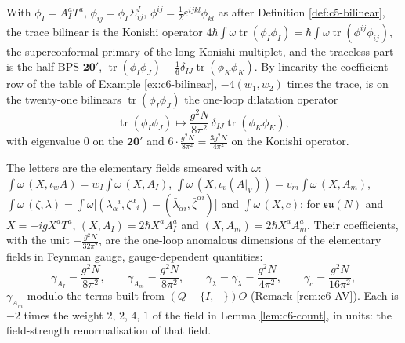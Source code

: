 \begin{remark}
With $\phi_I=A^a_IT^a$, $\phi_{ij}=\phi_I\Sigma^I_{ij}$, $\phi^{ij}=\tfrac12\varepsilon^{ijkl}\phi_{kl}$ as after Definition \ref{def:c5-bilinear}, the trace bilinear is the Konishi operator $4\hbar\int\omega\operatorname{tr}(\phi_I\phi_I)=\hbar\int\omega\operatorname{tr}(\phi^{ij}\phi_{ij})$, the superconformal primary of the long Konishi multiplet, and the traceless part is the half-BPS $\mathbf{20'}$, $\operatorname{tr}(\phi_I\phi_J)-\tfrac16\delta_{IJ}\operatorname{tr}(\phi_K\phi_K)$. By linearity the coefficient row of the table of Example \ref{ex:c6-bilinear}, $-4(w_1,w_2)$ times the trace, is on the twenty-one bilinears $\operatorname{tr}(\phi_I\phi_J)$ the one-loop dilatation operator
\[
\operatorname{tr}(\phi_I\phi_J)\longmapsto\frac{g^2N}{8\pi^2}\,\delta_{IJ}\operatorname{tr}(\phi_K\phi_K),
\]
with eigenvalue $0$ on the $\mathbf{20'}$ and $6\cdot\frac{g^2N}{8\pi^2}=\frac{3g^2N}{4\pi^2}$ on the Konishi operator.
\end{remark}

\begin{remark}
The letters are the elementary fields smeared with $\omega$: $\int\omega\,(X,\iota_wA)=w_I\int\omega\,(X,A_I)$, $\int\omega\,(X,\iota_v(A|_V))=v_m\int\omega\,(X,A_m)$, $\int\omega\,(\zeta,\lambda)=\int\omega\big[(\lambda_\alpha{}^i,\zeta^\alpha{}_i)-(\bar\lambda_{\dot\alpha i},\bar\zeta^{\dot\alpha i})\big]$ and $\int\omega\,(X,c)$; for $\mathfrak{su}(N)$ and $X=-igX^aT^a$, $(X,A_I)=2\hbar X^aA^a_I$ and $(X,A_m)=2\hbar X^aA^a_m$. Their coefficients, with the unit $-\frac{g^2N}{32\pi^2}$, are the one-loop anomalous dimensions of the elementary fields in Feynman gauge, gauge-dependent quantities:
\[
\gamma_{A_I}=\frac{g^2N}{8\pi^2},\qquad \gamma_{A_m}=\frac{g^2N}{8\pi^2},\qquad \gamma_{\lambda}=\gamma_{\bar\lambda}=\frac{g^2N}{4\pi^2},\qquad \gamma_c=\frac{g^2N}{16\pi^2},
\]
$\gamma_{A_m}$ modulo the terms built from $(Q+\{I,-\})O$ (Remark \ref{rem:c6-AV}). Each is $-2$ times the weight $2$, $2$, $4$, $1$ of the field in Lemma \ref{lem:c6-count}, in units: the field-strength renormalisation of that field.
\end{remark}

